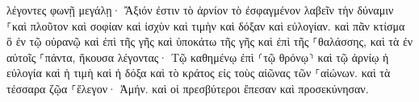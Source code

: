 \documentclass{openreader}
\begin{document}
λέγοντες φωνῇ μεγάλῃ· Ἄξιόν ἐστιν τὸ ἀρνίον τὸ ἐσφαγμένον λαβεῖν τὴν δύναμιν ⸀καὶ πλοῦτον καὶ σοφίαν καὶ ἰσχὺν καὶ τιμὴν καὶ δόξαν καὶ εὐλογίαν. 
καὶ πᾶν κτίσμα ὃ ἐν τῷ οὐρανῷ καὶ ἐπὶ τῆς γῆς καὶ ὑποκάτω τῆς γῆς καὶ ἐπὶ τῆς ⸀θαλάσσης, καὶ τὰ ἐν αὐτοῖς ⸀πάντα, ἤκουσα λέγοντας· Τῷ καθημένῳ ἐπὶ ⸂τῷ θρόνῳ⸃ καὶ τῷ ἀρνίῳ ἡ εὐλογία καὶ ἡ τιμὴ καὶ ἡ δόξα καὶ τὸ κράτος εἰς τοὺς αἰῶνας τῶν ⸀αἰώνων. 
καὶ τὰ τέσσαρα ζῷα ⸀ἔλεγον· Ἀμήν. καὶ οἱ πρεσβύτεροι ἔπεσαν καὶ προσεκύνησαν. 
\end{document}

